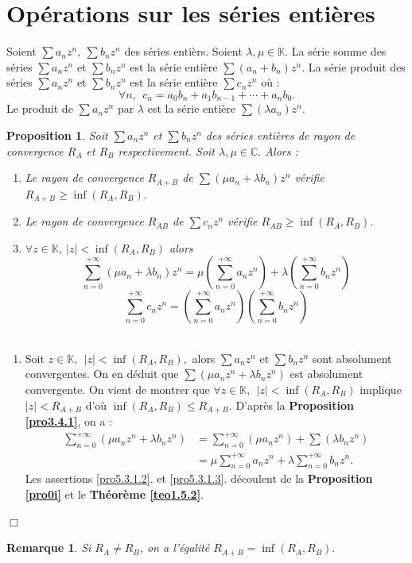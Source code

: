 \documentclass[11pt, a4paper]{book}
\newtheorem{pro}{Proposition}[section]
\newtheorem{rem}{Remarque}[section]
\newenvironment{pr}{\noindent {\bf Preuve} \noindent} {\hfill $\Box$\vskip 5mm}
\begin{document}
 \section{Op\'erations sur les s\'eries enti\`eres}
 Soient $\sum a_nz^n,~\sum b_nz^n$ des s\'eries enti\`ers. Soient $\lambda, \mu \in \mathbb{K}.$ La s\'erie somme des s\'eries $\sum a_nz^n$ et $\sum b_nz^n$ est la s\'erie enti\`ere $\sum (a_n+b_n)z^n.$ La s\'erie produit des s\'eries $\sum a_nz^n$ et $\sum b_nz^n$ est la s\'erie enti\`ere $\sum c_nz^n$ o\`u : $$\forall n,~~c_n =a_0b_n+a_1b_{n-1}+\cdots+a_nb_0.$$ Le produit de $\sum a_nz^n$ par $\lambda$ est la s\'erie enti\`ere $\sum (\lambda a_n)z^n.$
\begin{pro} \label{pro5.3.1} Soit $\sum a_nz^n$ et $\sum b_nz^n$ des s\'eries enti\`eres de rayon de convergence $R_A$ et $R_B$ respectivement. Soit $\lambda, \mu \in \mathbb{C}.$ Alors : 
\begin{enumerate}
\item \label{pro5.3.1.1} Le rayon de convergence $R_{A+B}$ de $\sum \left(\mu a_n+\lambda b_n\right)z^n$ v\'erifie $R_{A+B}\geq \inf(R_A,R_B).$
\item \label{pro5.3.1.2} Le rayon de convergence $R_{AB}$ de $\sum c_nz^n$ v\'erifie $R_{AB}\geq \inf (R_A,R_B).$
\item \label{pro5.3.1.3} $\forall z\in \mathbb{K},~|z|<\inf(R_A,R_B)$ alors $$ \sum_{n=0}^{+\infty}\left(\mu a_n+\lambda b_n\right)z^n =\mu \left(\sum_{n=0}^{+\infty} a_nz^n\right)+\lambda\left(\sum_{n=0}^{+\infty} b_nz^n\right)$$
$$\sum_{n=0}^{+\infty}c_nz^n=\left( \sum_{n=0}^{+\infty}a_nz^n\right)\left(\sum_{n=0}^{+\infty}b_nz^n\right)$$~
\end{enumerate} 
\end{pro}
\begin{pr} \quad
\begin{enumerate}
\item Soit $z\in \mathbb{K},~~|z|<\inf(R_A,R_B),$ alors $\sum a_n z^n$ et $\sum b_nz^n$ sont absolument convergentes. On en d\'eduit que $\sum\left(\mu a_nz^n+\lambda b_nz^n\right)$ est absolument convergente. On vient de montrer que $\forall z\in \mathbb{K},~~|z|<\inf(R_A,R_B)$ implique $|z|<R_{A+B}$ d'o\`u $\inf(R_A,R_B)\leq R_{A+B}.$ D'apr\`es la \textbf{Proposition \ref{pro3.4.1}}, on a : \begin{align*}
\sum_{n=0}^{+\infty}\left(\mu a_nz^n+\lambda b_nz^n\right)&=\sum_{n=0}^{+\infty}\left(\mu a_nz^n\right)+\sum \left(\lambda b_nz^n\right)\\ &=\mu \sum_{n=0}^{+\infty} a_nz^n+\lambda\sum_{n=0}^{+\infty}b_nz^n.
\end{align*}
Les assertions \ref{pro5.3.1.2}. et \ref{pro5.3.1.3}. d\'ecoulent de la \textbf{Proposition \ref{pro0i}} et le \textbf{Th\'eor\`eme \ref{teo1.5.2}}.
\end{enumerate}
\end{pr}
\begin{rem} Si $R_A\neq R_B$, on a l'\'egalit\'e $R_{A+B}=\inf(R_A, R_B).$ \end{rem}
\end{document}
